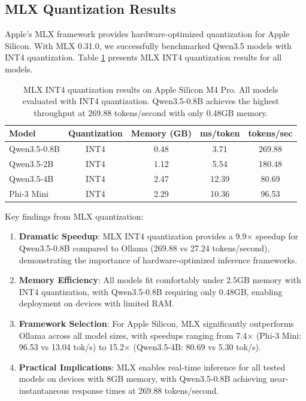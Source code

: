 \documentclass[11pt,a4paper]{article}
\begin{document}
\subsection{MLX Quantization Results}

Apple's MLX framework provides hardware-optimized quantization for Apple Silicon. With MLX 0.31.0, we successfully benchmarked Qwen3.5 models with INT4 quantization. Table \ref{tab:mlx_memory} presents MLX INT4 quantization results for all models.

\begin{table}[t]
\centering
\caption{MLX INT4 quantization results on Apple Silicon M4 Pro. All models evaluated with INT4 quantization. Qwen3.5-0.8B achieves the highest throughput at 269.88 tokens/second with only 0.48GB memory.}
\label{tab:mlx_memory}
\begin{tabular}{l|cccc}
\toprule
\textbf{Model} & \textbf{Quantization} & \textbf{Memory (GB)} & \textbf{ms/token} & \textbf{tokens/sec} \\
\midrule
Qwen3.5-0.8B & INT4 & 0.48 & 3.71 & 269.88 \\
Qwen3.5-2B & INT4 & 1.12 & 5.54 & 180.48 \\
Qwen3.5-4B & INT4 & 2.47 & 12.39 & 80.69 \\
Phi-3 Mini & INT4 & 2.29 & 10.36 & 96.53 \\
\bottomrule
\end{tabular}
\end{table}

Key findings from MLX quantization:

\begin{enumerate}[leftmargin=*,nosep]
    \item \textbf{Dramatic Speedup}: MLX INT4 quantization provides a 9.9$\times$ speedup for Qwen3.5-0.8B compared to Ollama (269.88 vs 27.24 tokens/second), demonstrating the importance of hardware-optimized inference frameworks.
    
    \item \textbf{Memory Efficiency}: All models fit comfortably under 2.5GB memory with INT4 quantization, with Qwen3.5-0.8B requiring only 0.48GB, enabling deployment on devices with limited RAM.
    
    \item \textbf{Framework Selection}: For Apple Silicon, MLX significantly outperforms Ollama across all model sizes, with speedups ranging from 7.4$\times$ (Phi-3 Mini: 96.53 vs 13.04 tok/s) to 15.2$\times$ (Qwen3.5-4B: 80.69 vs 5.30 tok/s).
    
    \item \textbf{Practical Implications}: MLX enables real-time inference for all tested models on devices with 8GB memory, with Qwen3.5-0.8B achieving near-instantaneous response times at 269.88 tokens/second.
\end{enumerate}
\end{document}
